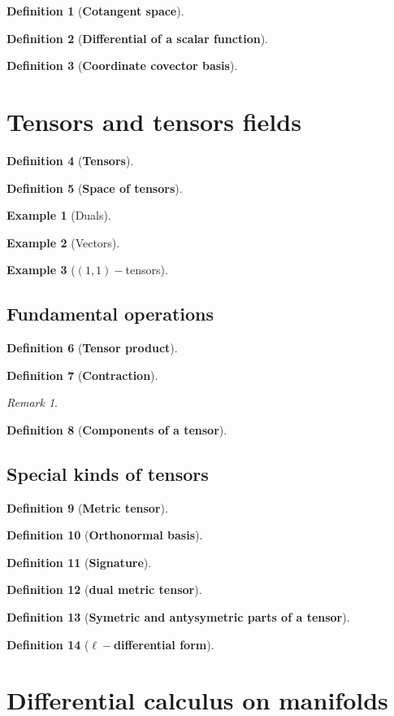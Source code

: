 \documentclass[10pt, letterpaper, oneside]{book}
\theoremstyle{theorem} %
\theoremstyle{theorem} %
\theoremstyle{definition}
\newtheorem{definition}{Definition}%
\theoremstyle{remark}
\newtheorem*{remark}{Remark}              %
\theoremstyle{definition}
\newtheorem{example}{Example}%
\theoremstyle{definition}
\theoremstyle{theorem}
\def\bde{\begin{definition}}
\def\ede{\end{definition}}
\def\bex{\begin{example}}
\def\eex{\end{example}}
\def\bre{\begin{remark}}
\def\ere{\end{remark}}
\begin{document}
\bde[\bf Cotangent space]
\ede

\bde[\bf Differential of a scalar function]
\ede

\bde[\bf Coordinate covector basis]
\ede


\section{Tensors and tensors fields}
\bde[\bf Tensors]
\ede

\bde[\bf Space of tensors]
\ede

\bex[Duals]
\eex

\bex[Vectors]
\eex

\bex[$(1,1)-$tensors]
\eex

\subsection*{Fundamental operations}
\bde[\bf Tensor product]
\ede

\bde[\bf Contraction]
\ede

\bre
\ere

\bde[\bf Components of a tensor]

\ede

\subsection{Special kinds of tensors}
\bde[\bf Metric tensor]
\ede

\bde[\bf Orthonormal basis]
\ede

\bde[\bf Signature]
\ede



\bde[\bf dual metric tensor]
\ede

\bde[\bf Symetric and antysymetric parts of a tensor]
\ede


\bde[\bf $\ell-$differential form]
\ede


\section{Differential calculus on manifolds}
\end{document}
